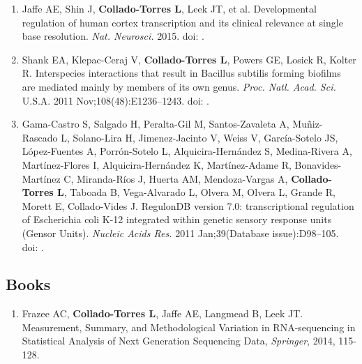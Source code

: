 \begin{enumerate}
        \item Jaffe AE, Shin J, \textbf{Collado-Torres L}, Leek JT, et al. Developmental regulation of human cortex transcription and its clinical relevance at single base resolution. \emph{Nat. Neurosci.} 2015. doi: .
        
        \item Shank EA, Klepac-Ceraj V, \textbf{Collado-Torres L}, Powers GE, Losick R, Kolter R. Interspecies interactions that result in Bacillus subtilis forming biofilms are mediated mainly by members of its own genus. \emph{Proc. Natl. Acad. Sci.} U.S.A. 2011 Nov;108(48):E1236–1243. doi: .
        
        \item Gama-Castro S, Salgado H, Peralta-Gil M, Santos-Zavaleta A, Muñiz-Rascado L, Solano-Lira H, Jimenez-Jacinto V, Weiss V, Garc\'ia-Sotelo JS, L\'opez-Fuentes A, Porr\'on-Sotelo L, Alquicira-Hern\'andez S, Medina-Rivera A, Mart\'inez-Flores I, Alquicira-Hern\'andez K, Mart\'inez-Adame R, Bonavides-Mart\'inez C, Miranda-R\'ios J, Huerta AM, Mendoza-Vargas A, \textbf{Collado-Torres L}, Taboada B, Vega-Alvarado L, Olvera M, Olvera L, Grande R, Morett E, Collado-Vides J. RegulonDB version 7.0: transcriptional regulation of Escherichia coli K-12 integrated within genetic sensory response units (Gensor Units). \emph{Nucleic Acids Res.} 2011 Jan;39(Database issue):D98–105. doi: .
    \end{enumerate}
\subsection{Books}
    \begin{enumerate}
        \item Frazee AC, \textbf{Collado-Torres L}, Jaffe AE, Langmead B, Leek JT. Measurement, Summary, and Methodological Variation in RNA-sequencing in Statistical Analysis of Next Generation Sequencing Data, \emph{Springer}, 2014, 115-128.
    \end{enumerate}

